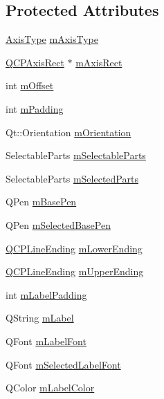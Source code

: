 \subsection*{Protected Attributes}
\begin{DoxyCompactItemize}
\item 
\hyperlink{class_q_c_p_axis_ae2bcc1728b382f10f064612b368bc18a}{Axis\-Type} \hyperlink{class_q_c_p_axis_ae704bf9f2c2b026f08dd4ccad79c616e}{m\-Axis\-Type}
\item 
\hyperlink{class_q_c_p_axis_rect}{Q\-C\-P\-Axis\-Rect} $\ast$ \hyperlink{class_q_c_p_axis_a6f150b65a202f32936997960e331dfcb}{m\-Axis\-Rect}
\item 
int \hyperlink{class_q_c_p_axis_a341426d76574ed800cb82582f32578bf}{m\-Offset}
\item 
int \hyperlink{class_q_c_p_axis_a52a805a4f03231210e0880db7f77e098}{m\-Padding}
\item 
Qt\-::\-Orientation \hyperlink{class_q_c_p_axis_a048e1792fa86f4f86df55200b3f0be36}{m\-Orientation}
\item 
Selectable\-Parts \hyperlink{class_q_c_p_axis_ab9042d8a095998f27a28b39411d8b9c3}{m\-Selectable\-Parts}
\item 
Selectable\-Parts \hyperlink{class_q_c_p_axis_a8f1eb0abfe2ae64652aa46b360e841e4}{m\-Selected\-Parts}
\item 
Q\-Pen \hyperlink{class_q_c_p_axis_ad6b4a0aee9558fb35529e960b8fef72d}{m\-Base\-Pen}
\item 
Q\-Pen \hyperlink{class_q_c_p_axis_a80baa4e3c16f9b6edf3eccacd2a50fde}{m\-Selected\-Base\-Pen}
\item 
\hyperlink{class_q_c_p_line_ending}{Q\-C\-P\-Line\-Ending} \hyperlink{class_q_c_p_axis_ab02ff8f6777721a0e4a42db403cc906b}{m\-Lower\-Ending}
\item 
\hyperlink{class_q_c_p_line_ending}{Q\-C\-P\-Line\-Ending} \hyperlink{class_q_c_p_axis_a988bf4ac17b3987a049f5aea7dff3ed4}{m\-Upper\-Ending}
\item 
int \hyperlink{class_q_c_p_axis_ae392a7c1a88a58765a7ed899642d248a}{m\-Label\-Padding}
\item 
Q\-String \hyperlink{class_q_c_p_axis_ae8001dbdfc47685c1cf7b98b044460e6}{m\-Label}
\item 
Q\-Font \hyperlink{class_q_c_p_axis_a37442d470e30e19b81ecaf979a34d046}{m\-Label\-Font}
\item 
Q\-Font \hyperlink{class_q_c_p_axis_ae48fe3489afadc0b3cd003233e2bf19f}{m\-Selected\-Label\-Font}
\item 
Q\-Color \hyperlink{class_q_c_p_axis_a457a003bb1c2b6ab73e5a173ba7558fd}{m\-Label\-Color}

\end{DoxyCompactItemize}
